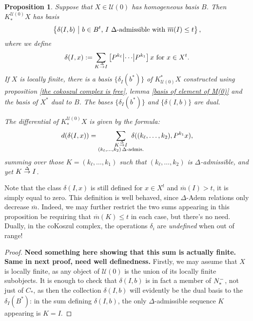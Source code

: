 \documentclass[11pt]{amsart}
\theoremstyle{plain}
\newtheorem{prop}[thm]{Proposition}
\theoremstyle{definition}
\newcommand{\calU}{\mathcal{U}}
\theoremstyle{plain}
\newcommand{\deltaalg}{\Delta} %
\newcommand{\minDimP}{\overline{m}}
\newcommand{\produces}[3]{#3:#1\sim #2}
\renewcommand{\produces}[3]{#1\rightarrow_{#3} #2}%
\renewcommand{\produces}[3]{#1\overset{\smash{#3}}{\rightarrow} #2}%
\newcommand{\Nop}{N^{\smash{-}}}
\begin{document}
\begin{Koszul complexes}
\begin{prop}\label{propDerivedIndTrivialUobject n=0}
Suppose that $X\in\calU(0)$ has homogeneous basis $B$. Then $K_*^{\calU(0)}X$ has basis
\[\left\{\delta(I,b)\ \middle|\ b\in B^t\textup{, $I$ $\deltaalg$-admissible with }\minDimP(I)\leq t\right\},\]
where we define
\[\delta(I,x):=
\sum_{\produces{K}{I}{\deltaalg}}\left[P^{k_\ell} \middle|\cdots\middle|P^{k_1} \right]x\textup{ for $x\in X^t$}.\]
%
If $X$ is locally finite, there is a basis $\{\delta_I(b^*)\}$ of $K^*_{\calU(0)}X$ constructed using proposition \ref{the cokoszul complex is free}, lemma \ref{basis of element of M(0)} and the basis of $X^*$ dual to $B$. The bases $\{\delta_I(b^*)\}$ and $\{\delta(I,b)\}$ are dual.

The differential of $K^{\calU(0)}_*X$ is given by the formula:
\[d(\delta(I,x))=\sum_{ \substack{\produces{K}{I}{\deltaalg}\\(k_{\ell},\ldots,k_2){\,\deltaalg\textup{-admis.}}}}\!\!\!\!\!\!\!\!\!\!\!\! \delta((k_{\ell},\ldots,k_2),P^{k_1}x),\]
summing over those $K=(k_{\ell},\ldots,k_1)$ such that $(k_{\ell},\ldots,k_2)$ is $\deltaalg$-admissible, and yet $\produces{K}{I}{\deltaalg}$.
\end{prop}
Note that the class $\delta(I,x)$ is still defined for $x\in X^t$ and $\minDimP(I)>t$, it is simply equal to zero. This definition is well behaved, since $\deltaalg$-Adem relations only decrease $\minDimP$. Indeed, we may further restrict the two sums appearing in this proposition be requiring that $\minDimP(K)\leq t$ in each case, but there's no need. Dually, in the coKoszul complex, the operations $\delta_i$ are \emph{undefined} when out of range!
\begin{proof}\textbf{Need something here showing that this sum is actually finite. Same in next proof, need well definedness.}
Firstly, we may assume that $X$ is locally finite, as any object of $\calU(0)$ is the union of its locally finite subobjects. It is enough to check that $\delta(I,b)$ is in fact a member of $\Nop_*$, not just of $C_*$, as then the collection $\delta(I,b)$ will evidently be the dual basis to the $\delta_I(B^*)$: in the sum defining $\delta(I,b)$, the only $\deltaalg$-admissible sequence $K$ appearing is $K=I$.  %


\end{proof}
\end{Koszul complexes}
\end{document}
